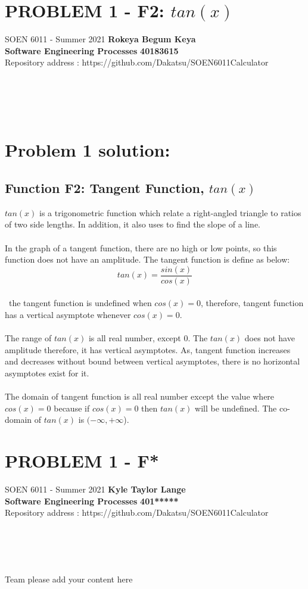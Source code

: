 \documentclass[a4paper, 11pt]{report}
\begin{document}
\noindent
\section*{PROBLEM 1 - F2: $tan(x)$}
\normalsize {SOEN 6011 - Summer 2021} \hfill \textbf{Rokeya Begum Keya} \\
\textbf{ Software Engineering Processes}  \hfill \textbf{40183615} \\
\hfill Repository address : https://github.com/Dakatsu/SOEN6011Calculator
\\\\\\\\\\
\section{Problem 1 solution:}
 \subsection{ Function F2: Tangent Function, $tan(x)$ } 
 \normalsize{$tan(x)$ is a trigonometric function which relate a right-angled triangle to ratios of two side lengths. In addition, it also uses to find the slope of a line.} 
 \\\\
 \normalsize{In the graph of a tangent function, there are no high or low points, so this function does not have an amplitude. The tangent function is define as below: \[tan(x) = \frac{sin(x)}{cos(x)}\] }
 \\\
 \normalsize{the tangent function is undefined when $cos(x) = 0 $, therefore, tangent function has a vertical asymptote whenever $cos(x) = 0 $. }
 \\\\
 \normalsize{ The range of $tan(x)$ is all real number, except 0. The $tan(x)$ does not have amplitude therefore, it has vertical asymptotes. As, tangent function increases and decreases without bound between vertical asymptotes, there is no horizontal asymptotes exist for it.}
 \\\\
 \normalsize{The domain of tangent function is all real number except the value where $cos(x) = 0$ because if $cos(x) = 0$ then $tan(x)$ will be undefined. The co-domain of $tan(x)$ is \((-\infty, +\infty\)).}
\pagebreak

\section*{PROBLEM 1 - F*}
\normalsize {SOEN 6011 - Summer 2021} \hfill \textbf{Kyle Taylor Lange} \\
\textbf{ Software Engineering Processes}  \hfill \textbf{401*****} \\
\hfill Repository address : https://github.com/Dakatsu/SOEN6011Calculator
\\\\\\\\\\
 \begin{center} Team please add your content here \end{center}
\pagebreak
\end{document}
